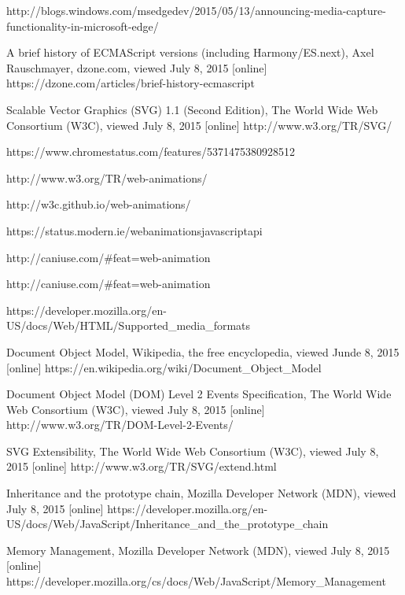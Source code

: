\begin{thebibliography}{99}
http://blogs.windows.com/msedgedev/2015/05/13/announcing-media-capture-functionality-in-microsoft-edge/

A brief history of ECMAScript versions (including Harmony/ES.next),  Axel Rauschmayer, dzone.com, viewed July 8, 2015 [online]
https://dzone.com/articles/brief-history-ecmascript

Scalable Vector Graphics (SVG) 1.1 (Second Edition), The World Wide Web Consortium (W3C), viewed July 8, 2015 [online]
http://www.w3.org/TR/SVG/

https://www.chromestatus.com/features/5371475380928512

http://www.w3.org/TR/web-animations/

http://w3c.github.io/web-animations/

https://status.modern.ie/webanimationsjavascriptapi

http://caniuse.com/\#feat=web-animation

http://caniuse.com/\#feat=web-animation

https://developer.mozilla.org/en-US/docs/Web/HTML/Supported\_media\_formats

Document Object Model, Wikipedia, the free encyclopedia, viewed Junde 8, 2015 [online]
https://en.wikipedia.org/wiki/Document\_Object\_Model

Document Object Model (DOM) Level 2 Events Specification, The World Wide Web Consortium (W3C), viewed July 8, 2015 [online]
http://www.w3.org/TR/DOM-Level-2-Events/


SVG Extensibility, The World Wide Web Consortium (W3C), viewed July 8, 2015 [online]
http://www.w3.org/TR/SVG/extend.html



Inheritance and the prototype chain, Mozilla Developer Network (MDN), viewed July 8, 2015 [online]
https://developer.mozilla.org/en-US/docs/Web/JavaScript/Inheritance\_and\_the\_prototype\_chain

Memory Management, Mozilla Developer Network (MDN), viewed July 8, 2015 [online]
https://developer.mozilla.org/cs/docs/Web/JavaScript/Memory\_Management


\end{thebibliography}
